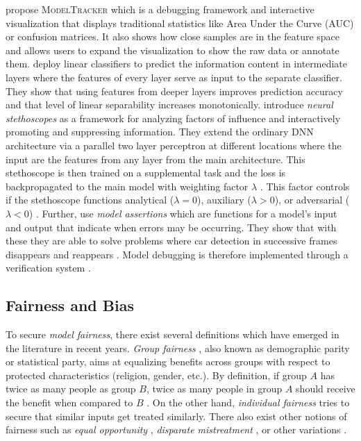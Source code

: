 \citet{amershi2015modeltracker} propose \textsc{ModelTracker} which is a debugging framework and interactive visualization that displays traditional statistics like Area Under the Curve (AUC) or confusion matrices. It also shows how close samples are in the feature space and allows users to expand the visualization to show the raw data or annotate them. \citet{AlainB17} deploy linear classifiers to predict the information content in intermediate layers where the features of every layer serve as input to the separate classifier. They show that using features from deeper layers improves prediction accuracy and  that level of linear separability increases monotonically. \citet{fuchs2018scrutinizing} introduce \emph{neural stethoscopes} as a framework for analyzing factors of influence and interactively promoting and suppressing information. They extend the ordinary DNN architecture via a parallel two layer perceptron at different locations where the input are the features from any layer from the main architecture. This stethoscope is then trained on a supplemental task and the loss is backpropagated to the main model with weighting factor $\lambda$ \citep{fuchs2018scrutinizing}. This factor controls if the stethoscope functions analytical ($\lambda = 0$), auxiliary ($\lambda > 0$), or adversarial ($\lambda < 0$) \citep{fuchs2018scrutinizing}. Further, \citet{KangRBZ20} use \emph{model assertions} which are functions for a model's input and output that indicate when errors may be occurring. They show that with these they are able to solve problems where car detection in successive frames disappears and reappears \citep{KangRBZ20}. Model debugging is therefore implemented through a verification system \citep{xie2020explainable}. 


\subsection{Fairness and Bias}
To secure \emph{model fairness}, there exist several definitions which have emerged in the literature in recent years. \emph{Group fairness} \citep{CaldersKP09}, also known as  demographic parity or statistical party, aims at equalizing benefits across groups with respect to protected characteristics (\eg religion, gender, etc.). By definition, if group $A$ has twice as many people as group $B$, twice as many people in group $A$ should receive the benefit when compared to $B$ \citep{xie2020explainable}. On the other hand, \emph{individual fairness} \citep{DworkHPRZ12} tries to secure that similar inputs get treated similarly. There also exist other notions of fairness such as \emph{equal opportunity} \citep{HardtPNS16}, \emph{disparate mistreatment} \citep{ZafarVGG17}, or other variations \citep{HeidariFGK18, WoodworthGOS17}.

